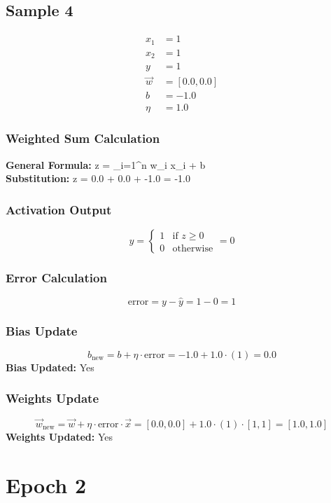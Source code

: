 \documentclass{article}
\begin{document}
\subsection*{Sample 4}
\begin{align*}
x_1 &= 1 \\
x_2 &= 1 \\
y &= 1 \\
\vec{w} &= [0.0, 0.0] \\
b &= -1.0 \\
\eta &= 1.0
\end{align*}

\subsubsection*{Weighted Sum Calculation}
\textbf{General Formula:} \quad
z = \sum_{i=1}^{n} w_i x_i + b
\\
\textbf{Substitution:} \quad
z = 0.0  + 0.0  + -1.0 = -1.0

\subsubsection*{Activation Output}
\[
\hat{y} =
\begin{cases}
1 & \text{if } z \geq 0 \\
0 & \text{otherwise}
\end{cases}
= 0
\]

\subsubsection*{Error Calculation}
\[
\text{error} = y - \hat{y} = 1 - 0 = 1
\]

\subsubsection*{Bias Update}
\[
b_{\text{new}} = b + \eta \cdot \text{error} = -1.0 + 1.0 \cdot (1) = 0.0
\]
\textbf{Bias Updated:} Yes

\subsubsection*{Weights Update}
\[
\vec{w}_{\text{new}} = \vec{w} + \eta \cdot \text{error} \cdot \vec{x} = 
[0.0, 0.0] + 1.0 \cdot (1) \cdot [1, 1] = 
[1.0, 1.0]
\]
\textbf{Weights Updated:} Yes

\section*{Epoch 2}
\end{document}
